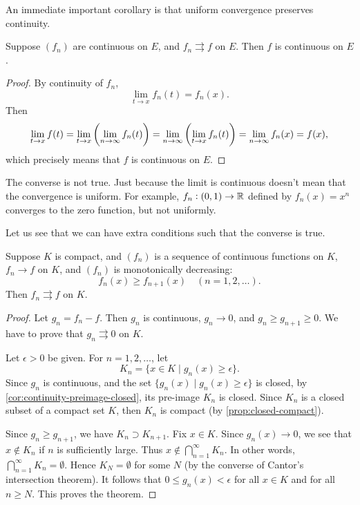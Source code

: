 An immediate important corollary is that uniform convergence preserves continuity.

\begin{corollary}\label{cor:uniform-continuity-preserve-continuity}
Suppose $(f_n)$ are continuous on $E$, and $f_n\rightrightarrows f$ on $E$. Then $f$ is continuous on $E$.
\end{corollary}

\begin{proof}
By continuity of $f_n$,
\[\lim_{t\to x}f_n(t)=f_n(x).\]
Then
\[\lim_{t\to x}f(t)=\lim_{t\to x}\left(\lim_{n\to\infty}f_n(t)\right)=\lim_{n\to\infty}\left(\lim_{t\to x}f_n(t)\right)=\lim_{n\to\infty}f_n(x)=f(x),\]
which precisely means that $f$ is continuous on $E$.
\end{proof}

\begin{remark}
The converse is not true. Just because the limit is continuous doesn't mean that the convergence is uniform. For example, $f_n:(0,1)\to\mathbb R$ defined by $f_n(x)=x^n$ converges to the zero function, but not uniformly.
\end{remark}

Let us see that we can have extra conditions such that the converse is true.

\begin{proposition}
Suppose $K$ is compact, and $(f_n)$ is a sequence of continuous functions on $K$, $f_n\to f$ on $K$, and $(f_n)$ is monotonically decreasing:
\[f_n(x)\ge f_{n+1}(x)\quad(n=1,2,\dots).\]
Then $f_n\rightrightarrows f$ on $K$.
\end{proposition}

\begin{proof}
Let $g_n=f_n-f$. Then $g_n$ is continuous, $g_n\to0$, and $g_n\ge g_{n+1}\ge0$. We have to prove that $g_n\rightrightarrows0$ on $K$.

Let $\epsilon>0$ be given. For $n=1,2,\dots$, let
\[K_n=\{x\in K\mid g_n(x)\ge\epsilon\}.\]
Since $g_n$ is continuous, and the set $\{g_n(x)\mid g_n(x)\ge\epsilon\}$ is closed, by \cref{cor:continuity-preimage-closed}, its pre-image $K_n$ is closed. Since $K_n$ is a closed subset of a compact set $K$, then $K_n$ is compact (by \cref{prop:closed-compact}).

Since $g_n\ge g_{n+1}$, we have $K_n\supset K_{n+1}$. Fix $x\in K$. Since $g_n(x)\to0$, we see that $x\notin K_n$ if $n$ is sufficiently large. Thus $x\notin\bigcap_{n=1}^{\infty}K_n$. In other words, $\bigcap_{n=1}^{\infty}K_n=\emptyset$. Hence $K_N=\emptyset$ for some $N$ (by the converse of Cantor's intersection theorem). It follows that $0\le g_n(x)<\epsilon$ for all $x\in K$ and for all $n\ge N$. This proves the theorem. 
\end{proof}

